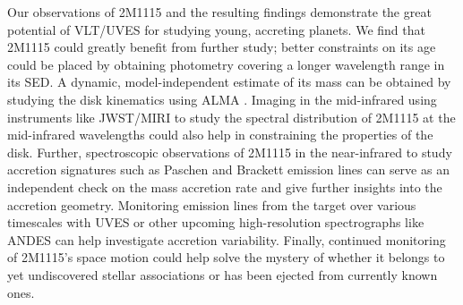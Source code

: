 \documentclass{aa}
\begin{document}
Our observations of 2M1115 and the resulting findings demonstrate the great potential of VLT/UVES for studying young, accreting planets. We find that 2M1115 could greatly benefit from further study; better constraints on its age could be placed by obtaining photometry covering a longer wavelength range in its SED. A dynamic, model-independent estimate of its mass can be obtained by studying the disk kinematics using ALMA \citep{alma}. Imaging in the mid-infrared using instruments like JWST/MIRI \citep{miri} to study the spectral distribution of 2M1115 at the mid-infrared wavelengths could also help in constraining the properties of the disk. Further, spectroscopic observations of 2M1115 in the near-infrared to study accretion signatures such as Paschen and Brackett emission lines can serve as an independent check on the mass accretion rate and give further insights into the accretion geometry.
Monitoring emission lines from the target over various timescales with UVES or other upcoming high-resolution spectrographs like ANDES \citep[formerly known as HIRES;][]{hires} can help investigate accretion variability. 
Finally, continued monitoring of 2M1115's space motion could help solve the mystery of whether it belongs to yet undiscovered stellar associations or has been ejected from currently known ones.
\end{document}
